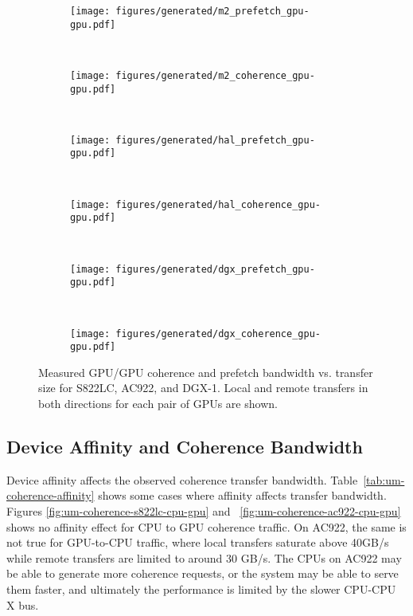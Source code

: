 \begin{figure}[H]
	\centering
	\begin{subfigure}[b]{0.45\textwidth}
		\texttt{[image: figures/generated/m2\_prefetch\_gpu-gpu.pdf]}
		\caption{}
		\label{fig:um-prefetch-s822lc-gpu-gpu}
	\end{subfigure}
	~
	\begin{subfigure}[b]{0.45\textwidth}
		\texttt{[image: figures/generated/m2\_coherence\_gpu-gpu.pdf]}
		\caption{}
		\label{fig:um-coherence-s822lc-gpu-gpu}
	\end{subfigure}
	\\
	\begin{subfigure}[b]{0.45\textwidth}
		\texttt{[image: figures/generated/hal\_prefetch\_gpu-gpu.pdf]}
		\caption{}
		\label{fig:um-prefetch-ac922-gpu-gpu}
	\end{subfigure}
	~
	\begin{subfigure}[b]{0.45\textwidth}
		\texttt{[image: figures/generated/hal\_coherence\_gpu-gpu.pdf]}
		\caption{}
		\label{fig:um-coherence-ac922-gpu-gpu}
	\end{subfigure}
	\\
	\begin{subfigure}[b]{0.45\textwidth}
		\texttt{[image: figures/generated/dgx\_prefetch\_gpu-gpu.pdf]}
		\caption{}
		\label{fig:um-prefetch-dgx-gpu-gpu}
	\end{subfigure}
	~
	\begin{subfigure}[b]{0.45\textwidth}
		\texttt{[image: figures/generated/dgx\_coherence\_gpu-gpu.pdf]}
		\caption{}
		\label{fig:um-coherence-dgx-gpu-gpu}
	\end{subfigure}
	\caption[GPU/GPU Coherence and Prefetch Bandwidth]{
		Measured GPU/GPU coherence and prefetch bandwidth vs. transfer size for S822LC, AC922, and DGX-1.
		Local and remote transfers in both directions for each pair of GPUs are shown.
	}
	\label{fig:um-gpu-gpu}
\end{figure}



\subsection{Device Affinity and Coherence Bandwidth}

Device affinity affects the observed coherence transfer bandwidth.
Table~\ref{tab:um-coherence-affinity} shows some cases where affinity affects transfer bandwidth.
Figures \ref{fig:um-coherence-s822lc-cpu-gpu} and ~\ref{fig:um-coherence-ac922-cpu-gpu} shows no affinity effect for CPU to GPU coherence traffic.
On AC922, the same is not true for GPU-to-CPU traffic, where local transfers saturate above 40GB/s while remote transfers are limited to around 30 GB/s.
The CPUs on AC922 may be able to generate more coherence requests, or the system may be able to serve them faster, and ultimately the performance is limited by the slower CPU-CPU X bus.

